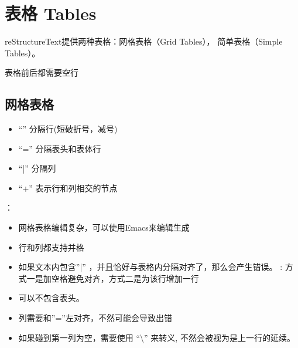 \documentclass[a4paper,10pt,english]{sphinxmanual}
\begin{document}
\begin{sphinxVerbatim}[commandchars=\\\{\}]
\end{sphinxVerbatim}


\section{表格 Tables}
\label{\detokenize{reStructureText_syntax:tables}}
\sphinxAtStartPar
reStructureText提供两种表格：网格表格（Grid Tables）， 简单表格（Simple Tables）。

\sphinxAtStartPar
表格前后都需要空行


\subsection{网格表格}
\label{\detokenize{reStructureText_syntax:id9}}\begin{itemize}
\item {} 
\sphinxAtStartPar
“\sphinxhyphen{}” 分隔行(短破折号，减号)

\item {} 
\sphinxAtStartPar
“=” 分隔表头和表体行

\item {} 
\sphinxAtStartPar
“|” 分隔列

\item {} 
\sphinxAtStartPar
“+” 表示行和列相交的节点

\end{itemize}

\sphinxAtStartPar
{}：
\begin{itemize}
\item {} 
\sphinxAtStartPar
网格表格编辑复杂，可以使用Emacs来编辑生成

\item {} 
\sphinxAtStartPar
行和列都支持并格

\item {} 
\sphinxAtStartPar
如果文本内包含”|” ，并且恰好与表格内分隔对齐了，那么会产生错误。 : 方式一是加空格避免对齐，方式二是为该行增加一行

\item {} 
\sphinxAtStartPar
可以不包含表头。

\item {} 
\sphinxAtStartPar
列需要和”=”左对齐，不然可能会导致出错

\item {} 
\sphinxAtStartPar
如果碰到第一列为空，需要使用 “\textbackslash{}” 来转义, 不然会被视为是上一行的延续。

\end{itemize}
\end{document}
